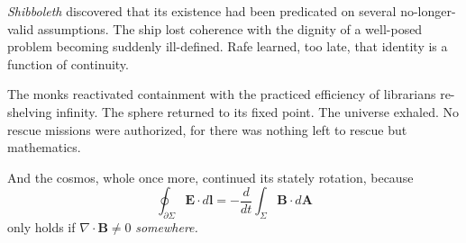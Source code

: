 \begin{tcolorbox}[colback=gray!5,colframe=gray!40,boxrule=0.5pt,arc=3pt,boxsep=10pt,left=8pt,right=8pt,top=8pt,bottom=8pt]
\emph{Shibboleth} discovered that its existence had been predicated on several no-longer-valid assumptions. The ship lost coherence with the dignity of a well-posed problem becoming suddenly ill-defined. Rafe learned, too late, that identity is a function of continuity.


\medskip

The monks reactivated containment with the practiced efficiency of librarians re-shelving infinity. The sphere returned to its fixed point. The universe exhaled. No rescue missions were authorized, for there was nothing left to rescue but mathematics.

\medskip

And the cosmos, whole once more, continued its stately rotation, because
\[
\oint_{\partial \Sigma} \mathbf{E} \cdot d\mathbf{l} = -\frac{d}{dt} \int_{\Sigma} \mathbf{B} \cdot d\mathbf{A}
\]
only holds if $\nabla \cdot \mathbf{B} \ne 0$ \emph{somewhere.}

\end{tcolorbox}

\thispagestyle{empty}
\begin{figure}[p]
\centering
{}
\end{figure}
